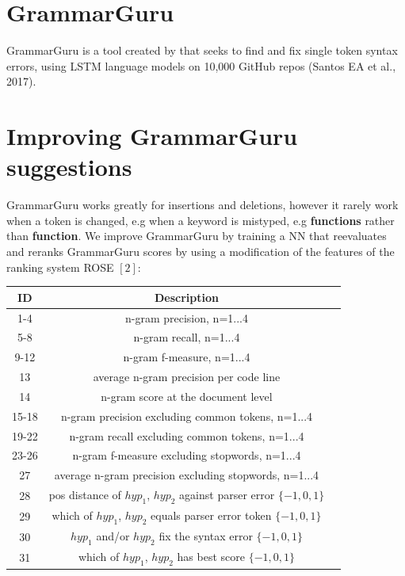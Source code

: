 \documentclass[a0,portrait]{a0poster}
\begin{document}
\begin{multicols}{2}
\section*{GrammarGuru}
\LARGE
GrammarGuru is a tool created by that seeks to find and fix single token syntax
errors, using LSTM language models on 10,000 GitHub repos (Santos EA et al., 2017).

\section*{Improving GrammarGuru suggestions}

GrammarGuru works greatly for insertions and deletions, however it rarely work when a token is changed, e.g when a keyword is mistyped, e.g \textbf{functions} rather than \textbf{function}. We improve GrammarGuru by training a NN that reevaluates and reranks GrammarGuru scores by using a modification of the features of the ranking system ROSE $[2]$:
\color{Black}
\begin{center}
\begin{tabular}{ |c|c|c| } 
 \hline
 \textbf{ID} & \textbf{Description}\\ 
 \hline
 1-4 & n-gram precision, n=1...4\\ 
 5-8 & n-gram recall, n=1...4 \\
 9-12 & n-gram f-measure, n=1...4 \\
 13 & average n-gram precision per code line\\
 14 & n-gram score at the document level \\
 15-18 & n-gram precision excluding common tokens, n=1...4\\
 19-22 & n-gram recall excluding common tokens, n=1...4\\
 23-26 & n-gram f-measure excluding stopwords, n=1...4\\
 27 & average n-gram precision excluding stopwords, n=1...4\\
 28 & pos distance of $hyp_1$, $hyp_2$ against parser error $\{-1, 0, 1 \}$\\
 29 & which of $hyp_1$, $hyp_2$ equals parser error token $\{ -1, 0, 1\}$\\
 30 & $hyp_1$ and/or $hyp_2$ fix the syntax error $\{ -1, 0, 1\}$ \\
 31 & which of $hyp_1$, $hyp_2$ has best score $\{-1, 0, 1\}$\\
 \hline
\end{tabular}
\end{center}


\end{multicols}
\end{document}
